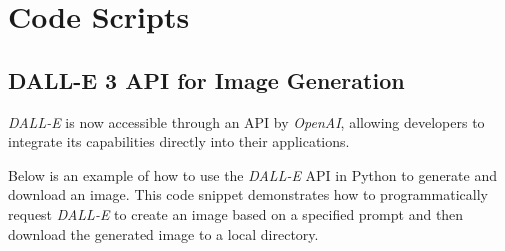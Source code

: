 \section{Code Scripts}
\label{appendix:code}


\subsection{DALL-E 3 API for Image Generation}
\label{subsec:dalle-api}

\textit{DALL-E} is now accessible through an API by \textit{OpenAI}, allowing developers to integrate its capabilities directly into their applications.

Below is an example of how to use the \textit{DALL-E} API in Python to generate and download an image. This code snippet demonstrates how to programmatically request \textit{DALL-E} to create an image based on a specified prompt and then download the generated image to a local directory.



